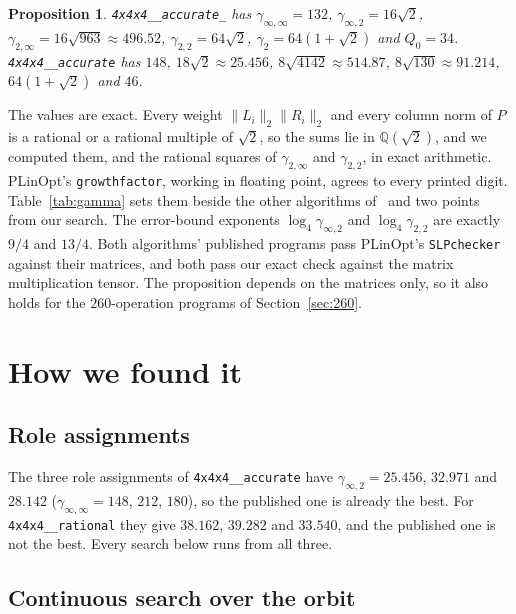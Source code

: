 \documentclass[11pt]{article}
\newtheorem{proposition}[theorem]{Proposition}
\theoremstyle{remark}
\newcommand{\Q}{\mathbb{Q}}
\newcommand{\ginf}{\gamma_{\infty,2}}
\newcommand{\giinf}{\gamma_{\infty,\infty}}
\newcommand{\acc}{\texttt{4x4x4\_\allowbreak 48\_\allowbreak accurate}\xspace}
\newcommand{\acct}{\texttt{4x4x4\_\allowbreak 48\_\allowbreak accurate\_\allowbreak 262}\xspace}
\newcommand{\rat}{\texttt{4x4x4\_\allowbreak 48\_\allowbreak rational}\xspace}
\begin{document}
\begin{proposition}\label{prop:gamma}
\acct has $\giinf=132$, $\ginf=16\sqrt2$,
$\gamma_{2,\infty}=16\sqrt{963}\approx496.52$, $\gamma_{2,2}=64\sqrt2$,
$\gamma_2=64(1+\sqrt2)$ and $Q_0=34$.  \acc has $148$,
$18\sqrt2\approx25.456$, $8\sqrt{4142}\approx514.87$,
$8\sqrt{130}\approx91.214$, $64(1+\sqrt2)$ and $46$.
\end{proposition}

The values are exact.  Every weight $\lVert L_i\rVert_2\lVert
R_i\rVert_2$ and every column norm of $P$ is a rational or a rational
multiple of $\sqrt2$, so the sums lie in $\Q(\sqrt2)$, and we computed
them, and the rational squares of $\gamma_{2,\infty}$ and
$\gamma_{2,2}$, in exact arithmetic.  PLinOpt's \texttt{growthfactor},
working in floating point, agrees to every printed digit.  Table~\ref{tab:gamma} sets them beside
the other algorithms of~\cite[Table~2]{DPS26a} and two points from our
search.  The error-bound exponents $\log_4\ginf$ and $\log_4\gamma_{2,2}$
are exactly $9/4$ and $13/4$.  Both algorithms' published programs pass
PLinOpt's \texttt{SLPchecker} against their matrices, and both pass our
exact check against the matrix multiplication tensor.  The proposition
depends on the matrices only, so it also holds for the $260$-operation
programs of Section~\ref{sec:260}.

\section{How we found it}\label{sec:search}

\subsection{Role assignments}

The three role assignments of \acc have $\ginf=25.456$,
$32.971$ and $28.142$ ($\giinf=148$, $212$, $180$), so the published one
is already the best.  For \rat they give $38.162$, $39.282$ and
$33.540$, and the published one is not the best.  Every search below
runs from all three.

\subsection{Continuous search over the orbit}
\end{document}
